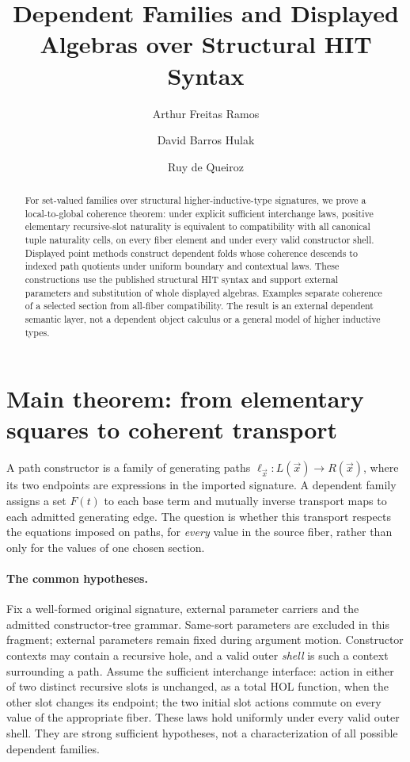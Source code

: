 \documentclass[11pt,a4paper]{article}
\title{Dependent Families and Displayed Algebras over Structural HIT Syntax}
\author{Arthur Freitas Ramos \and David Barros Hulak \and Ruy de Queiroz}
\begin{document}
\maketitle
\begin{abstract}
For set-valued families over structural higher-inductive-type signatures,
we prove a local-to-global coherence theorem: under explicit sufficient
interchange laws, positive elementary recursive-slot naturality is equivalent
to compatibility with all canonical tuple naturality cells, on every fiber
element and under every valid constructor shell. Displayed point methods
construct dependent folds whose coherence descends to indexed path quotients
under uniform boundary and contextual laws.
These constructions use the published structural HIT syntax and support
external parameters and substitution of whole displayed algebras. Examples
separate coherence of a selected section from all-fiber compatibility.
The result is an external dependent semantic layer, not a dependent object
calculus or a general model of higher inductive types.
\end{abstract}

\section{Main theorem: from elementary squares to coherent transport}

A path constructor is a family of generating paths
\(\ell_{\vec x}:L(\vec x)\longrightarrow R(\vec x)\), where its two
endpoints are expressions in the imported signature. A dependent family
assigns a set \(F(t)\) to each base term and mutually inverse transport maps
to each admitted generating edge. The question is whether this transport
respects the equations imposed on paths, for \emph{every} value in the source
fiber, rather than only for the values of one chosen section.

\paragraph{The common hypotheses.}
Fix a well-formed original signature, external parameter carriers and the
admitted constructor-tree grammar. Same-sort parameters are excluded in this
fragment; external parameters remain fixed during argument motion. Constructor
contexts may contain a recursive hole, and a valid outer \emph{shell} is such
a context surrounding a path. Assume the sufficient interchange interface:
action in either of two distinct recursive slots is unchanged, as a total HOL
function, when the other slot changes its endpoint; the two initial slot
actions commute on every value of the appropriate fiber. These laws hold
uniformly under every valid outer shell. They are strong sufficient
hypotheses, not a characterization of all possible dependent families.
\end{document}
